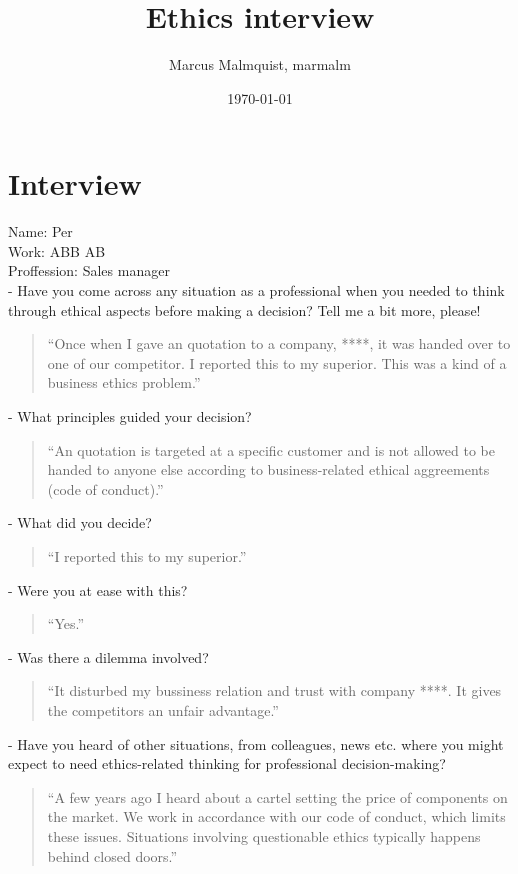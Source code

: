 \documentclass[12pt,a4paper]{article}
\title{Ethics interview}
\author{Marcus Malmquist, marmalm}
\date{\today}
\begin{document}
\maketitle

\section{Interview}
Name: Per\\
Work: ABB AB\\
Proffession: Sales manager\\

\noindent- Have you come across any situation as a professional when you needed to think through ethical aspects before making a decision? Tell me a bit more, please!
\begin{quote}
  ``Once when I gave an quotation to a company, ****, it was handed over to one of our competitor. I reported this to my superior. This was a kind of a business ethics problem.''
\end{quote}

\noindent- What principles guided your decision?
\begin{quote}
  ``An quotation is targeted at a specific customer and is not allowed to be handed to anyone else according to business-related ethical aggreements (code of conduct).''
\end{quote}

\noindent- What did you decide?
\begin{quote}
  ``I reported this to my superior.''
\end{quote}

\noindent- Were you at ease with this?
\begin{quote}
  ``Yes.''
\end{quote}

\noindent- Was there a dilemma involved?
\begin{quote}
  ``It disturbed my bussiness relation and trust with company ****. It gives the competitors an unfair advantage.''
\end{quote}

\noindent- Have you heard of other situations, from colleagues, news etc. where you might expect to need ethics-related thinking for professional decision-making?
\begin{quote}
  ``A few years ago I heard about a cartel setting the price of components on the market. We work in accordance with our code of conduct, which limits these issues. Situations involving questionable ethics typically happens behind closed doors.''
\end{quote}
\end{document}
